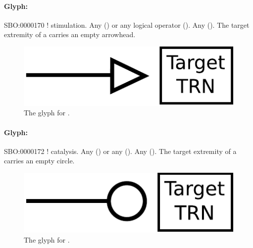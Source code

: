 \paragraph{Glyph: }\label{sec:stimulation}


\begin{glyphDescription}
 \glyphSboTerm SBO:0000170 ! stimulation.
 \glyphOrigin Any  () or any logical operator ().
 \glyphTarget Any  ().
 \glyphEndPoint The target extremity of a  carries an empty arrowhead.
 \end{glyphDescription}

\begin{figure}[H]
  \centering
  \includegraphics[scale = 0.5]{images/stimulation}
  \caption{The \PD glyph for .}
  \label{fig:stimulation}
\end{figure}


\paragraph{Glyph: }\label{sec:catalysis}


\begin{glyphDescription}
 \glyphSboTerm SBO:0000172 ! catalysis.
 \glyphOrigin Any  () or any  ().
 \glyphTarget Any  ().
 \glyphNode The target extremity of a  carries an empty circle.
 \end{glyphDescription}

\begin{figure}[H]
  \centering
  \includegraphics[scale = 0.5]{images/catalysis}
  \caption{The \PD glyph for .}
  \label{fig:catalysis}
\end{figure}


